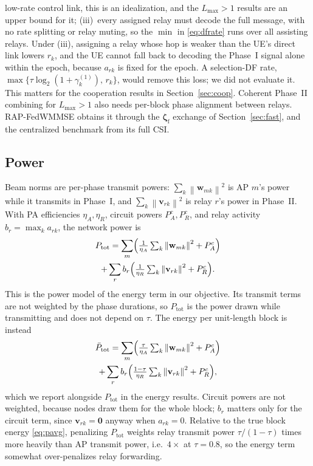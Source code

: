 \documentclass[conference]{IEEEtran}
\newcommand{\norm}[1]{\left\lVert #1 \right\rVert}
\newcommand{\zf}{\boldsymbol{\zeta}_{\mathrm{f}}}
\begin{document}
low-rate control link, this is an idealization, and the $L_{\max}>1$ results
are an upper bound for it;
(iii)~every assigned relay must decode the full message, with no rate
splitting or relay muting, so the $\min$ in \eqref{eq:dfrate} runs over all
assisting relays. Under (iii), assigning a relay whose hop is weaker than the
UE's direct link lowers $r_k$, and the UE cannot fall back to decoding the
Phase~I signal alone within the epoch, because $a_{rk}$ is fixed for the
epoch. A selection-DF rate,
$\max\{\tau\log_2(1+\gamma_k^{(1)}),\,r_k\}$, would remove this loss; we did
not evaluate it. This matters for the cooperation results in
Section~\ref{sec:coop}. Coherent Phase~II combining for $L_{\max}>1$ also
needs per-block phase alignment between relays. RAP-FedWMMSE obtains it
through the $\zf$ exchange of Section~\ref{sec:fast}, and the centralized
benchmark from its full CSI.

\subsection{Power}
Beam norms are per-phase transmit powers: $\sum_k\norm{\mathbf{w}_{mk}}^2$ is
AP $m$'s power while it transmits in Phase~I, and
$\sum_k\norm{\mathbf{v}_{rk}}^2$ is relay $r$'s power in Phase~II. With PA
efficiencies $\eta_A,\eta_R$, circuit powers $P^c_A, P^c_R$, and relay
activity $b_r = \max_k a_{rk}$, the network power is
\begin{multline}
P_{\mathrm{tot}} = \sum_m \Bigl(\tfrac{1}{\eta_A}\textstyle\sum_k
\norm{\mathbf{w}_{mk}}^2 + P^c_A\Bigr) \\
+ \sum_r b_r \Bigl(\tfrac{1}{\eta_R}\textstyle\sum_k
\norm{\mathbf{v}_{rk}}^2 + P^c_R\Bigr).
\label{eq:ptot}
\end{multline}
This is the power model of the energy term in our objective. Its transmit
terms are not weighted by the phase durations, so $P_{\mathrm{tot}}$ is the
power drawn while transmitting and does not depend on $\tau$. The energy per
unit-length block is instead
\begin{multline}
\bar P_{\mathrm{tot}} = \sum_m \Bigl(\tfrac{\tau}{\eta_A}\textstyle\sum_k
\norm{\mathbf{w}_{mk}}^2 + P^c_A\Bigr) \\
+ \sum_r b_r \Bigl(\tfrac{1-\tau}{\eta_R}\textstyle\sum_k
\norm{\mathbf{v}_{rk}}^2 + P^c_R\Bigr),
\label{eq:pavg}
\end{multline}
which we report alongside $P_{\mathrm{tot}}$ in the energy results. Circuit
powers are not weighted, because nodes draw them for the whole block; $b_r$
matters only for the circuit term, since $\mathbf{v}_{rk}=\mathbf{0}$ anyway
when $a_{rk}=0$. Relative to the true block energy \eqref{eq:pavg},
penalizing $P_{\mathrm{tot}}$ weights relay transmit power
$\tau/(1-\tau)$ times more heavily than AP transmit power, i.e.\ $4\times$
at $\tau=0.8$, so the energy term somewhat over-penalizes relay forwarding.
\end{document}
